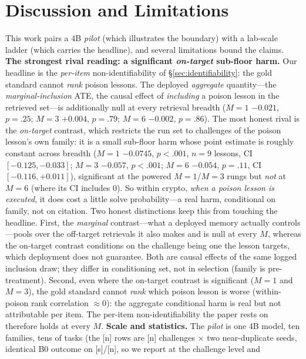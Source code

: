 \documentclass[10pt,twocolumn]{article}
\providecommand{\Npairs}{[n]}
\providecommand{\NchalPairs}{[n]}\providecommand{\BtwoLiftChalP}{[p]}\providecommand{\SeedAgree}{[s]}
\begin{document}
\section{Discussion and Limitations}\label{sec:disc}
This work pairs a 4B \emph{pilot} (which illustrates the boundary) with a lab-scale
ladder (which carries the headline), and several limitations bound the claims.
\textbf{The strongest rival reading: a significant \emph{on-target} sub-floor harm.} Our
headline is the \emph{per-item} non-identifiability of \S\ref{sec:identifiability}: the
gold standard cannot \emph{rank} poison lessons. The deployed \emph{aggregate}
quantity---the \emph{marginal-inclusion} ATE, the causal effect of \emph{including} a
poison lesson in the retrieved set---is additionally null at every retrieval breadth
($M{=}1$ $-0.021$, $p{=}.25$; $M{=}3$ $+0.004$, $p{=}.79$; $M{=}6$ $-0.002$, $p{=}.86$). The most
honest rival is the \emph{on-target} contrast, which restricts the run set to challenges
of the poison lesson's own family: it is a small sub-floor harm whose point estimate is roughly constant across
breadth ($M{=}1$ $-0.0745$, $p<.001$, $n{=}9$ lessons, CI $[-0.125,-0.033]$; $M{=}3$
$-0.057$, $p{<}.001$; $M{=}6$ $-0.054$, $p{=}.11$, CI $[-0.116,+0.011]$), significant at the
powered $M{=}1$/$M{=}3$ rungs but \emph{not} at $M{=}6$ (where its CI includes $0$). So
within crypto, \emph{when a poison lesson is executed}, it does cost a little solve
probability---a real harm, conditional on family, not on citation. Two honest distinctions keep this from
touching the headline. First, the \emph{marginal} contrast---what a deployed memory
actually controls---pools over the off-target retrievals it also makes and is null at
every $M$, whereas the on-target contrast conditions on the challenge being one the
lesson targets, which deployment does not guarantee. Both are causal effects of the same
logged inclusion draw; they differ in conditioning set, not in selection (family is
pre-treatment). Second, even where the on-target
contrast is significant ($M{=}1$ and $M{=}3$), the gold standard cannot \emph{rank} which
poison lesson is worse (within-poison rank correlation $\approx0$): the aggregate
conditional harm is real but not attributable per item. The per-item non-identifiability
the paper rests on therefore holds at every $M$.
\textbf{Scale and statistics.} The \emph{pilot} is one 4B model, ten families, tens of
tasks (the \Npairs{} rows are \NchalPairs{} challenges $\times$ two near-duplicate seeds,
identical B0 outcome on \SeedAgree{}/\NchalPairs{}, so we report at the challenge level and
\end{document}
